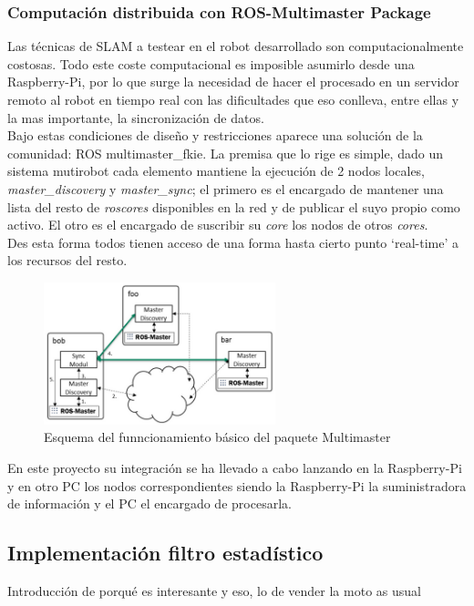 \subsubsection{Computación distribuida con ROS-Multimaster Package}
Las técnicas de SLAM a testear en el robot desarrollado son computacionalmente costosas. Todo este coste computacional es
imposible asumirlo desde una Raspberry-Pi, por lo que surge la necesidad de hacer el procesado en un servidor remoto al robot en tiempo real con las 
dificultades que eso conlleva, entre ellas y la mas importante, la sincronización de datos.\\
Bajo estas condiciones de diseño y restricciones aparece una solución de la comunidad: ROS multimaster\_fkie. La premisa que lo rige es simple, dado un sistema mutirobot
cada elemento mantiene la ejecución de 2 nodos locales, \textit{master\_discovery} y \textit{master\_sync}; el primero es el encargado de mantener una lista del resto 
de \textit{roscores} disponibles en la red y de publicar el suyo propio como activo. El otro es el encargado de suscribir su \textit{core} los nodos de otros \textit{cores}.\\
Des esta forma todos tienen acceso de una forma hasta cierto punto `real-time' a los recursos del resto. 
\begin{figure}[!ht]
    \centering
    \includegraphics[width=0.6\textwidth]{images/ros_multimaster.png}
    \caption{Esquema del funncionamiento básico del paquete Multimaster}
\end{figure}

En este proyecto su integración se ha llevado a cabo lanzando en la Raspberry-Pi y en otro PC los nodos correspondientes siendo la Raspberry-Pi la 
suministradora de información y el PC el encargado de procesarla.

\subsection{Implementación filtro estadístico}
Introducción de porqué es interesante y eso, lo de vender la moto as usual

